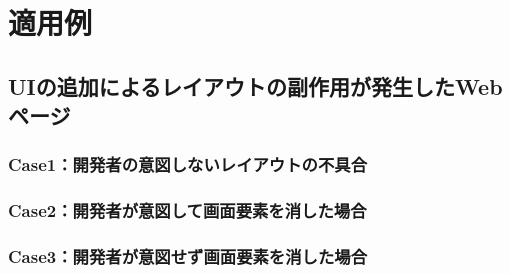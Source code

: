 \chapter{適用例}\label{cha:Indication}



\section{UIの追加によるレイアウトの副作用が発生したWebページ}\label{sec:result_area_detection}

\subsection{Case1：開発者の意図しないレイアウトの不具合}\label{subsec:result_rect_area}

\subsection{Case2：開発者が意図して画面要素を消した場合}\label{subsec:result_underline_area}

\subsection{Case3：開発者が意図せず画面要素を消した場合}\label{subsec:result_underline}
